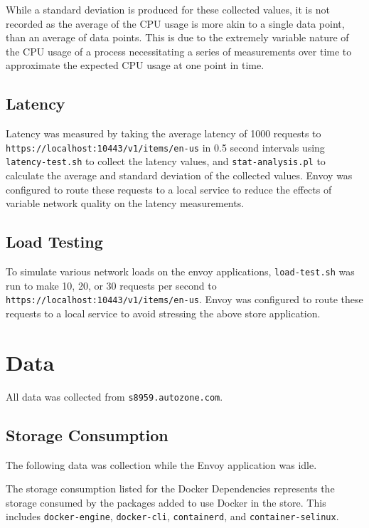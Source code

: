\documentclass{article}
\begin{document}
While a standard deviation is produced for these collected values, it is not recorded as the average of the CPU usage is more akin to a single data point, than an average of data points. This is due to the extremely variable nature of the CPU usage of a process necessitating a series of measurements over time to approximate the expected CPU usage at one point in time.

\subsection{Latency}
Latency was measured by taking the average latency of 1000 requests to\\
\texttt{https://localhost:10443/v1/items/en-us} in 0.5 second intervals using\\
\texttt{latency-test.sh} to collect the latency values, and \texttt{stat-analysis.pl} to calculate the average and standard deviation of the collected values. Envoy was configured to route these requests to a local service to reduce the effects of variable network quality on the latency measurements.

\subsection{Load Testing}
To simulate various network loads on the envoy applications, \texttt{load-test.sh} was run to make 10, 20, or 30 requests per second to \texttt{https://localhost:10443/v1/items/en-us}. Envoy was configured to route these requests to a local service to avoid stressing the above store application.

\section{Data}
All data was collected from \texttt{s8959.autozone.com}.

\subsection{Storage Consumption}
The following data was collection while the Envoy application was idle.

The storage consumption listed for the Docker Dependencies represents the storage consumed by the packages added to use Docker in the store. This includes \texttt{docker-engine}, \texttt{docker-cli}, \texttt{containerd}, and \texttt{container-selinux}.
\end{document}
